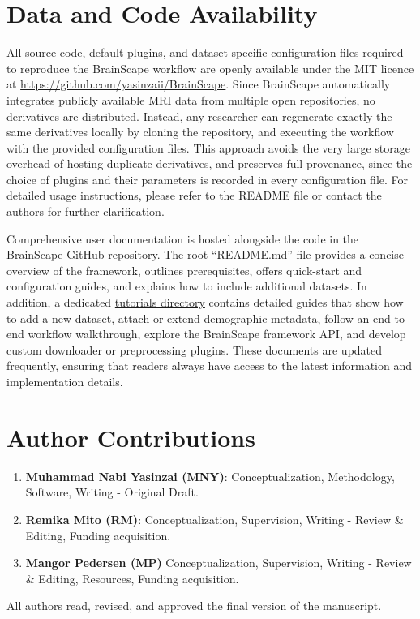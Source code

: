 \section*{Data and Code Availability}

All source code, default plugins, and dataset-specific configuration files required 
to reproduce the BrainScape workflow are openly available under the MIT licence at 
\url{https://github.com/yasinzaii/BrainScape}. Since BrainScape automatically integrates 
publicly available MRI data from multiple open repositories, no derivatives are distributed. 
Instead, any researcher can regenerate exactly the same derivatives locally by cloning the repository, 
and executing the workflow with the provided configuration files. 
This approach avoids the very large storage overhead of hosting duplicate derivatives, 
and preserves full provenance, since the choice of plugins and their parameters is recorded 
in every configuration file. 
For detailed usage instructions, please refer to the README file or contact the authors for further clarification.

Comprehensive user documentation is hosted alongside the code in the BrainScape GitHub repository. 
The root ``README.md'' file provides a concise overview of the framework, outlines prerequisites, 
offers quick-start and configuration guides, and explains how to include additional datasets. 
In addition, a dedicated \href{https://github.com/yasinzaii/BrainScape/tree/main/tutorials}{tutorials directory} 
contains detailed guides that show how to add a new dataset, attach or extend demographic metadata, 
follow an end-to-end workflow walkthrough, explore the BrainScape framework API, 
and develop custom downloader or preprocessing plugins. 
These documents are updated frequently, 
ensuring that readers always have access to the latest information and implementation details.



\section*{Author Contributions}

\begin{enumerate}
    \item \textbf{Muhammad Nabi Yasinzai (MNY)}: Conceptualization, Methodology, Software, Writing - Original Draft.
    \item \textbf{Remika Mito (RM)}: Conceptualization, Supervision, Writing - Review \& Editing, Funding acquisition. 
    \item \textbf{Mangor Pedersen (MP)} Conceptualization, Supervision, Writing - Review \& Editing, Resources, Funding acquisition. 
\end{enumerate}
All authors read, revised, and approved the final version of the manuscript.


